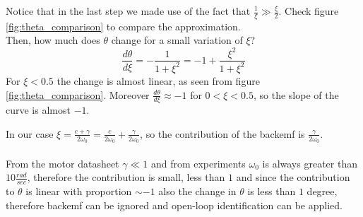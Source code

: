 Notice that in the last step we made use of the fact that $\frac{1}{\xi} \gg \frac{\xi}{2}$. Check figure \ref{fig:theta_comparison} to compare the approximation. \\ 
Then, how much does $\theta$ change for a small variation of $\xi$?
$$\frac{d\theta}{d\xi} = -\frac{1}{1+\xi^2} = -1 + \frac{\xi^2}{1+\xi^2}$$
For $\xi < 0.5$ the change is almost linear, as seen from figure \ref{fig:theta_comparison}. Moreover $\frac{d\theta}{d\xi} \approx -1$ for $0 < \xi < 0.5$, so the slope of the curve is almost $-1$.

In our case $\xi = \frac{c+\gamma}{2\omega_0}= \frac{c}{2\omega_0}+ \frac{\gamma}{2\omega_0}$, so the contribution of the backemf is $\frac{\gamma}{2\omega_0}$. \\ \\
From the motor datasheet $\gamma \ll 1$ and from experiments $\omega_0$ is always greater than $10 \frac{rad}{sec}$, therefore the contribution is small, less than $1$ and since the contribution to $\theta$ is linear with proportion $\sim -1$ also the change in $\theta$ is less than $1$ degree, therefore backemf can be ignored and open-loop identification can be applied.

